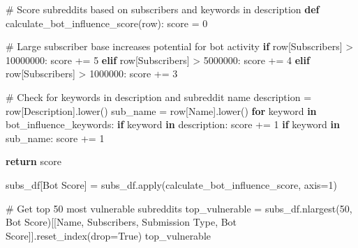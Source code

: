 \documentclass[
  12pt,
  letterpaper,
  DIV=11,
  numbers=noendperiod]{scrartcl}
\newenvironment{Shaded}{\begin{snugshade}}{\end{snugshade}}
\newcommand{\BuiltInTok}[1]{\textcolor[rgb]{0.00,0.23,0.31}{#1}}
\newcommand{\CommentTok}[1]{\textcolor[rgb]{0.37,0.37,0.37}{#1}}
\newcommand{\ControlFlowTok}[1]{\textcolor[rgb]{0.00,0.23,0.31}{\textbf{#1}}}
\newcommand{\DecValTok}[1]{\textcolor[rgb]{0.68,0.00,0.00}{#1}}
\newcommand{\KeywordTok}[1]{\textcolor[rgb]{0.00,0.23,0.31}{\textbf{#1}}}
\newcommand{\NormalTok}[1]{\textcolor[rgb]{0.00,0.23,0.31}{#1}}
\newcommand{\OperatorTok}[1]{\textcolor[rgb]{0.37,0.37,0.37}{#1}}
\newcommand{\StringTok}[1]{\textcolor[rgb]{0.13,0.47,0.30}{#1}}
\newcommand{\VariableTok}[1]{\textcolor[rgb]{0.07,0.07,0.07}{#1}}
\begin{document}
\begin{Shaded}
\begin{Highlighting}[]
\CommentTok{\# Score subreddits based on subscribers and keywords in description}
\KeywordTok{def}\NormalTok{ calculate\_bot\_influence\_score(row):}
\NormalTok{    score }\OperatorTok{=} \DecValTok{0}
    
    \CommentTok{\# Large subscriber base increases potential for bot activity}
    \ControlFlowTok{if}\NormalTok{ row[}\StringTok{\textquotesingle{}Subscribers\textquotesingle{}}\NormalTok{] }\OperatorTok{\textgreater{}} \DecValTok{10000000}\NormalTok{:}
\NormalTok{        score }\OperatorTok{+=} \DecValTok{5}
    \ControlFlowTok{elif}\NormalTok{ row[}\StringTok{\textquotesingle{}Subscribers\textquotesingle{}}\NormalTok{] }\OperatorTok{\textgreater{}} \DecValTok{5000000}\NormalTok{:}
\NormalTok{        score }\OperatorTok{+=} \DecValTok{4}
    \ControlFlowTok{elif}\NormalTok{ row[}\StringTok{\textquotesingle{}Subscribers\textquotesingle{}}\NormalTok{] }\OperatorTok{\textgreater{}} \DecValTok{1000000}\NormalTok{:}
\NormalTok{        score }\OperatorTok{+=} \DecValTok{3}
        
    \CommentTok{\# Check for keywords in description and subreddit name}
\NormalTok{    description }\OperatorTok{=}\NormalTok{ row[}\StringTok{\textquotesingle{}Description\textquotesingle{}}\NormalTok{].lower()}
\NormalTok{    sub\_name }\OperatorTok{=}\NormalTok{ row[}\StringTok{\textquotesingle{}Name\textquotesingle{}}\NormalTok{].lower()}
    \ControlFlowTok{for}\NormalTok{ keyword }\KeywordTok{in}\NormalTok{ bot\_influence\_keywords:}
        \ControlFlowTok{if}\NormalTok{ keyword }\KeywordTok{in}\NormalTok{ description:}
\NormalTok{            score }\OperatorTok{+=} \DecValTok{1}
        \ControlFlowTok{if}\NormalTok{ keyword }\KeywordTok{in}\NormalTok{ sub\_name:}
\NormalTok{            score }\OperatorTok{+=} \DecValTok{1}
            
    \ControlFlowTok{return}\NormalTok{ score}

\NormalTok{subs\_df[}\StringTok{\textquotesingle{}Bot Score\textquotesingle{}}\NormalTok{] }\OperatorTok{=}\NormalTok{ subs\_df.}\BuiltInTok{apply}\NormalTok{(calculate\_bot\_influence\_score, axis}\OperatorTok{=}\DecValTok{1}\NormalTok{)}

\CommentTok{\# Get top 50 most vulnerable subreddits}
\NormalTok{top\_vulnerable }\OperatorTok{=}\NormalTok{ subs\_df.nlargest(}\DecValTok{50}\NormalTok{, }\StringTok{\textquotesingle{}Bot Score\textquotesingle{}}\NormalTok{)[[}\StringTok{\textquotesingle{}Name\textquotesingle{}}\NormalTok{, }\StringTok{\textquotesingle{}Subscribers\textquotesingle{}}\NormalTok{, }\StringTok{\textquotesingle{}Submission Type\textquotesingle{}}\NormalTok{, }\StringTok{\textquotesingle{}Bot Score\textquotesingle{}}\NormalTok{]].reset\_index(drop}\OperatorTok{=}\VariableTok{True}\NormalTok{)}
\NormalTok{top\_vulnerable}
\end{Highlighting}
\end{Shaded}
\end{document}

